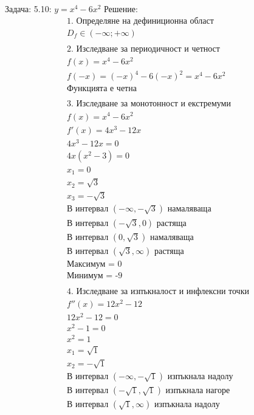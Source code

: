 \documentclass[a4paper, 20pt, fleqn, border=2pt]{article}
\begin{document}
\begin{enumerate}
Задача: 5.10: $y = x^4 - 6x^2$
Решение:
\begin{equation}
\begin{split}
    \text{1. Определяне на дефиниционна област} \\
    D_f \in (-\infty; +\infty) \\
    \\
    \text{2. Изследване за периодичност и четност} \\
    f(x) = x^4 - 6x^2 \\
    f(-x) = (-x)^4 - 6(-x)^2 = x^4 - 6x^2 \\
    \text{Функцията е четна} \\
    \\
    \text{3. Изследване за монотонност и екстремуми} \\
    f(x) = x^4 - 6x^2 \\
    f'(x) = 4x^3 - 12x \\
    4x^3 - 12x = 0 \\
    4x(x^2 - 3) = 0 \\
    x_1 = 0 \\
    x_2 = \sqrt{3} \\
    x_3 = -\sqrt{3} \\
    \text{В интервал } (-\infty, -\sqrt{3}) \text{ намаляваща} \\
    \text{В интервал } (-\sqrt{3}, 0) \text{ растяща} \\
    \text{В интервал } (0, \sqrt{3}) \text{ намаляваща} \\
    \text{В интервал } (\sqrt{3}, \infty) \text{ растяща} \\
    \text{Максимум = 0} \\
    \text{Минимум = -9} \\
    \\
    \text{4. Изследване за изпъкналост и инфлексни точки} \\
    f''(x) = 12x^2 - 12 \\
    12x^2 - 12 = 0 \\
    x^2 - 1 = 0 \\
    x^2 = 1 \\
    x_1 = \sqrt{1} \\
    x_2 = -\sqrt{1} \\
    \text{В интервал } (-\infty, -\sqrt{1}) \text{ изпъкнала надолу} \\
    \text{В интервал } (-\sqrt{1}, \sqrt{1}) \text{ изпъкнала нагоре} \\
    \text{В интервал } (\sqrt{1}, \infty) \text{ изпъкнала надолу}
\end{split}
\end{equation}


\end{enumerate}
\end{document}
